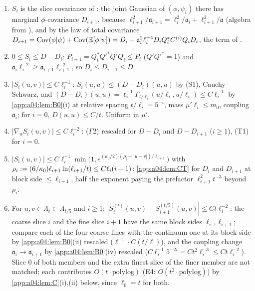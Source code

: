 \begin{lemma}\label{app:a04:lem:S}
\begin{enumerate}[label=\textup{(S\arabic*)},leftmargin=*,start=0]
\item $S_i$ is the slice covariance of \cite[(2.17)]{K1}: the joint Gaussian of $(\phi,\psi_i)$ there has marginal $\phi$-covariance $D_{i+1}$, because $\ell_{i+1}^2/\mathfrak a_{i+1}=\ell_i^2/\mathfrak a_i+\ell_{i+1}^2/\mathfrak a$ (algebra from \cite[(2.13)]{K1}), and by the law of total covariance $D_{i+1}=\operatorname{Cov}(\phi|\psi)+\operatorname{Cov}(\mathbb E[\phi|\psi])=D_i+\mathfrak a_i^2\ell_i^{-4}D_iQ_i^*C^{(i)}Q_iD_i$, the term of \cite[(2.17)]{K1}.
\item $0\le S_i\le D-D_i$: $P_{i+1}=Q_i^*Q'^*Q'Q_i\le P_i$ ($Q'Q'^*=1$) and $\mathfrak a_i\ell_i^{-2}\ge\mathfrak a_{i+1}\ell_{i+1}^{-2}$, so $D_i\le D_{i+1}\le D$.
\item $|S_i(u,v)|\le C\ell_i^{-1}$: $S_i(u,u)\le(D-D_i)(u,u)$ by (S1), Cauchy--Schwarz, and $(D-D_i)(u,u)=\ell_i^{-1}\Gamma_{t/\ell_i}(u/\ell_i,u/\ell_i)\le C\ell_i^{-1}$ by \cref{app:a04:lem:B0}(i) at relative spacing $t/\ell_i=5^{-i}$, mass $\mu'\ell_i\le m_0$, coupling $\mathfrak a_i$; for $i=0$, $D(u,u)\le C/t$. Uniform in $\mu'$.
\item $|\nabla_uS_i(u,v)|\le C\ell_i^{-2}$: ($\Gamma$2) rescaled for $D-D_i$ and $D-D_{i+1}$ ($i\ge1$), (T1) for $i=0$.
\item $|S_i(u,v)|\le C\ell_i^{-1}\min\big(1,e^{(\kappa_0/2)(\rho_i-|u-v|)/\ell_{i+1}}\big)$ with $\rho_i:=(6/\kappa_0)\ell_{i+1}\ln(\ell_{i+1}/t)\le C\ell_i(i+1)$: \cref{app:a04:lem:CT} for $D_i$ and $D_{i+1}$ at block side $\le\ell_{i+1}$, half the exponent paying the prefactor $\ell_{i+1}^2t^{-3}$ beyond $\rho_i$.
\item For $u,v\in\Lambda_t\subset\Lambda_{t/5}$ and $i\ge1$: $|S^{(t)}_i(u,v)-S^{(t/5)}_{i+1}(u,v)|\le Ct\ell_i^{-2}$: the coarse slice $i$ and the fine slice $i+1$ have the same block sides $\ell_i,\ell_{i+1}$; compare each of the four coarse lines with the continuum one at its block side by \cref{app:a04:lem:B0}(ii) rescaled ($\ell^{-1}\cdot C(t/\ell)$), and the coupling change $\mathfrak a_{i}\to\mathfrak a_{i+1}$ by \cref{app:a04:lem:B0}(iv) rescaled ($C\ell_i^{-1}5^{-2i}=Ct^2\ell_i^{-3}\le Ct\ell_i^{-2}$). Slice $0$ of both members and the extra finest slice of the finer member are not matched; each contributes $O(t\cdot\mathrm{polylog})$ (E4: $O(t^2\cdot\mathrm{polylog})$) by \cref{app:a04:lem:C}(i),(ii) below, since $\ell_0=t$ for both.
\end{enumerate}
\end{lemma}

